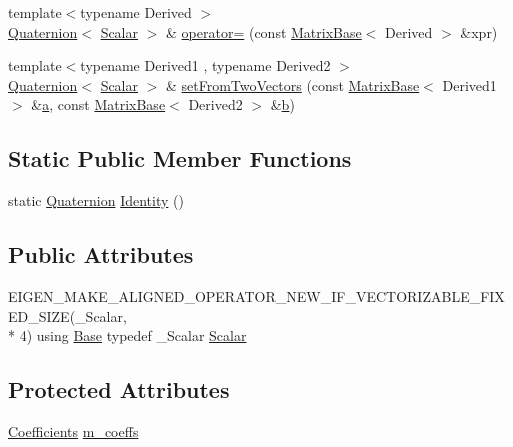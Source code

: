 \begin{DoxyCompactItemize}
\item 
{\footnotesize template$<$typename Derived $>$ }\\\hyperlink{class_quaternion}{Quaternion}$<$ \hyperlink{class_rotation_base_ae9cbe0a3a87dfe2fa70958d9fe948a09}{Scalar} $>$ \& \hyperlink{class_quaternion_aa2e85bd25b74435fecd161a3a8c9f5fe}{operator=} (const \hyperlink{class_matrix_base}{Matrix\-Base}$<$ Derived $>$ \&xpr)
\item 
{\footnotesize template$<$typename Derived1 , typename Derived2 $>$ }\\\hyperlink{class_quaternion}{Quaternion}$<$ \hyperlink{class_rotation_base_ae9cbe0a3a87dfe2fa70958d9fe948a09}{Scalar} $>$ \& \hyperlink{class_quaternion_a3695d141d17e0c34ee54a787ae5d4c71}{set\-From\-Two\-Vectors} (const \hyperlink{class_matrix_base}{Matrix\-Base}$<$ Derived1 $>$ \&\hyperlink{glext_8h_ac8729153468b5dcf13f971b21d84d4e5}{a}, const \hyperlink{class_matrix_base}{Matrix\-Base}$<$ Derived2 $>$ \&\hyperlink{glext_8h_a6eba317e3cf44d6d26c04a5a8f197dcb}{b})
\end{DoxyCompactItemize}
\subsection*{Static Public Member Functions}
\begin{DoxyCompactItemize}
\item 
static \hyperlink{class_quaternion}{Quaternion} \hyperlink{class_quaternion_a3a16d70a440085a6520c2acd81e5ee5c}{Identity} ()
\end{DoxyCompactItemize}
\subsection*{Public Attributes}
\begin{DoxyCompactItemize}
\item 
E\-I\-G\-E\-N\-\_\-\-M\-A\-K\-E\-\_\-\-A\-L\-I\-G\-N\-E\-D\-\_\-\-O\-P\-E\-R\-A\-T\-O\-R\-\_\-\-N\-E\-W\-\_\-\-I\-F\-\_\-\-V\-E\-C\-T\-O\-R\-I\-Z\-A\-B\-L\-E\-\_\-\-F\-I\-X\-E\-D\-\_\-\-S\-I\-Z\-E(\-\_\-\-Scalar, \\*
4) using \hyperlink{class_rotation_base}{Base} typedef \-\_\-\-Scalar \hyperlink{class_quaternion_a8ea39a2c8e8ed06b7763f93af1c04266}{Scalar}
\end{DoxyCompactItemize}
\subsection*{Protected Attributes}
\begin{DoxyCompactItemize}
\item 
\hyperlink{class_quaternion_ad622be107fa0707a98a1966345f961a1}{Coefficients} \hyperlink{class_quaternion_a61cc84a5d914b6ce737c609b3cffd6d0}{m\-\_\-coeffs}
\end{DoxyCompactItemize}


